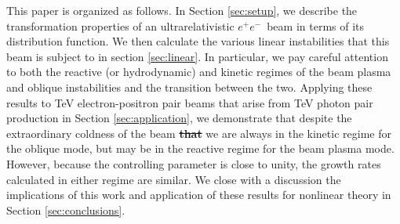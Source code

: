 \documentclass[usenatbib,iop,apj,numberedappendix]{aeb_emulateapj_2015}
\newcommand\ac[1]{{\color{green} \bf #1}} %
\newcommand\cp[1]{{\color{blue} \bf #1}} %
\newcommand\bmath[1] {\mbox{\boldmath$\rm #1$}}
\newcommand{\epm}{\ensuremath{e^+e^-}}
\begin{document}
This paper is organized as follows.  In Section \ref{sec:setup}, we describe the transformation properties of an ultrarelativistic \epm\ beam in terms of its distribution function.  We then calculate the various linear instabilities that this beam is subject to in section \ref{sec:linear}.  In particular, we pay careful attention to both the reactive (or hydrodynamic) and kinetic regimes of the beam plasma and oblique instabilities and the transition between the two.  Applying these results to TeV electron-positron pair beams that arise from TeV photon pair production in Section \ref{sec:application},
we demonstrate that despite the extraordinary coldness of the beam \cp{\sout{that}} we are always in the kinetic regime for the oblique mode, but may be in the reactive regime for the beam plasma mode.  However, because the controlling parameter is close to unity, the growth rates calculated in either regime are similar.  We close with a discussion the implications of this work and application of these results for nonlinear theory in Section \ref{sec:conclusions}.

\end{document}

